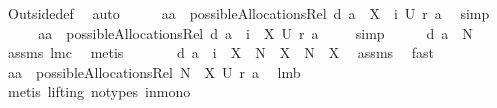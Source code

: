 \begin{isabellebody}
\ Outside{\isacharunderscore}def\ \isamarkupfalse%
\ auto\isanewline
\ \ \isamarkupfalse%
\ \isamarkupfalse%
\ {\isachardoublequoteopen}{\isacharquery}aa\ {\isasymin}\ possibleAllocationsRel\ {\isacharparenleft}{\isacharquery}d\ a\ {\isacharminus}\ X\ {\isasymunion}\ {\isacharbraceleft}i{\isacharbraceright}{\isacharparenright}\ {\isacharparenleft}{\isacharquery}U\ {\isacharparenleft}{\isacharquery}r\ a{\isacharparenright}{\isacharparenright}{\isachardoublequoteclose}\ \isamarkupfalse%
\ simp\isanewline
\ \ \isamarkupfalse%
\ \isamarkupfalse%
\ {\isachardoublequoteopen}{\isacharquery}aa\ {\isasymin}\ possibleAllocationsRel\ {\isacharparenleft}{\isacharquery}d\ a\ {\isasymunion}\ {\isacharbraceleft}i{\isacharbraceright}\ {\isacharminus}\ X{\isacharparenright}\ {\isacharparenleft}{\isacharquery}U\ {\isacharparenleft}{\isacharquery}r\ a{\isacharparenright}{\isacharparenright}{\isachardoublequoteclose}\ \isamarkupfalse%
\ {}\ \isamarkupfalse%
\ simp\isanewline
\ \ \isamarkupfalse%
\ \isamarkupfalse%
\ {\isachardoublequoteopen}{\isacharquery}d\ a\ {\isasymsubseteq}\ N{\isachardoublequoteclose}\ \isamarkupfalse%
\ assms{\isacharparenleft}{}{\isacharparenright}\ lm{}{}c\ \isamarkupfalse%
\ metis\isanewline
\ \ \isamarkupfalse%
\ \isamarkupfalse%
\ \isamarkupfalse%
\ {\isachardoublequoteopen}{\isacharparenleft}{\isacharquery}d\ a\ {\isasymunion}\ {\isacharbraceleft}i{\isacharbraceright}\ {\isacharminus}\ X{\isacharparenright}\ {\isasymunion}\ {\isacharparenleft}N\ {\isacharminus}\ X{\isacharparenright}\ {\isacharequal}\ N\ {\isacharminus}\ X{\isachardoublequoteclose}\ \isamarkupfalse%
\ assms\ \isamarkupfalse%
\ fast\isanewline
\ \ \isamarkupfalse%
\ \isamarkupfalse%
\ {\isachardoublequoteopen}{\isacharquery}aa\ {\isasymin}\ possibleAllocationsRel\ {\isacharparenleft}N\ {\isacharminus}\ X{\isacharparenright}\ {\isacharparenleft}{\isacharquery}U\ {\isacharparenleft}{\isacharquery}r\ a{\isacharparenright}{\isacharparenright}{\isachardoublequoteclose}\ \isamarkupfalse%
\ lm{}{}b\ \isanewline
\ \ \isamarkupfalse%
\ {\isacharparenleft}metis\ {\isacharparenleft}lifting{\isacharcomma}\ no{\isacharunderscore}types{\isacharparenright}\ in{\isacharunderscore}mono{\isacharparenright}\isanewline

\end{isabellebody}
